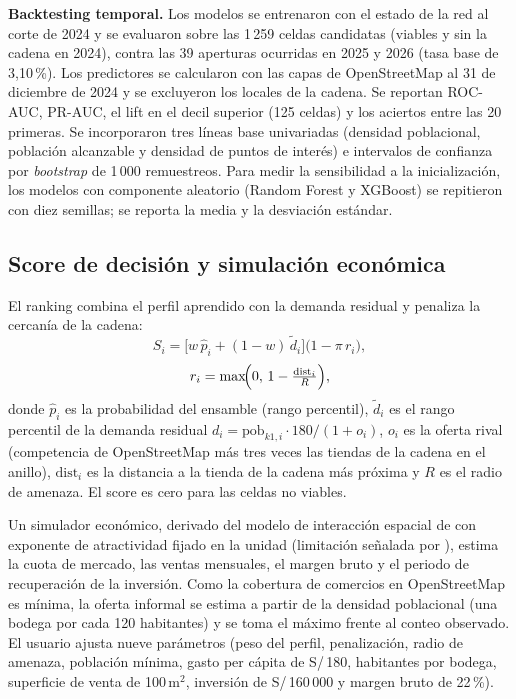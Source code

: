 \documentclass[10pt,letterpaper,twocolumn]{article}
\begin{document}
\textbf{Backtesting temporal.} Los modelos se entrenaron con el estado de la red al corte de 2024 y se evaluaron sobre las 1\,259 celdas candidatas (viables y sin la cadena en 2024), contra las 39 aperturas ocurridas en 2025 y 2026 (tasa base de 3,10\,\%). Los predictores se calcularon con las capas de OpenStreetMap al 31 de diciembre de 2024 y se excluyeron los locales de la cadena. Se reportan ROC-AUC, PR-AUC, el lift en el decil superior (125 celdas) y los aciertos entre las 20 primeras. Se incorporaron tres líneas base univariadas (densidad poblacional, población alcanzable y densidad de puntos de interés) e intervalos de confianza por \textit{bootstrap} de 1\,000 remuestreos. Para medir la sensibilidad a la inicialización, los modelos con componente aleatorio (Random Forest y XGBoost) se repitieron con diez semillas; se reporta la media y la desviación estándar.

\subsection{Score de decisión y simulación económica}

El ranking combina el perfil aprendido con la demanda residual y penaliza la cercanía de la cadena:
\begin{equation}
S_i=\bigl[w\,\hat p_i+(1-w)\,\tilde d_i\bigr]\bigl(1-\pi\,r_i\bigr),
\end{equation}
\begin{equation}
r_i=\max\!\Bigl(0,\,1-\tfrac{\text{dist}_i}{R}\Bigr),
\end{equation}
donde $\hat p_i$ es la probabilidad del ensamble (rango percentil), $\tilde d_i$ es el rango percentil de la demanda residual $d_i=\text{pob}_{k1,i}\cdot 180/(1+o_i)$, $o_i$ es la oferta rival (competencia de OpenStreetMap más tres veces las tiendas de la cadena en el anillo), $\text{dist}_i$ es la distancia a la tienda de la cadena más próxima y $R$ es el radio de amenaza. El score es cero para las celdas no viables.

Un simulador económico, derivado del modelo de interacción espacial de \citet{huff1964} con exponente de atractividad fijado en la unidad (limitación señalada por \citealp{liang2020}), estima la cuota de mercado, las ventas mensuales, el margen bruto y el periodo de recuperación de la inversión. Como la cobertura de comercios en OpenStreetMap es mínima, la oferta informal se estima a partir de la densidad poblacional (una bodega por cada 120 habitantes) y se toma el máximo frente al conteo observado. El usuario ajusta nueve parámetros (peso del perfil, penalización, radio de amenaza, población mínima, gasto per cápita de S/\,180, habitantes por bodega, superficie de venta de 100\,m$^2$, inversión de S/\,160\,000 y margen bruto de 22\,\%).
\end{document}
